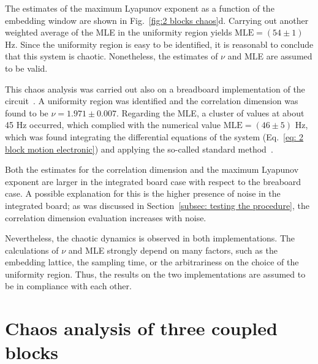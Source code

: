 The estimates of the maximum Lyapunov exponent as a function of the embedding window are shown in
Fig.~\ref{fig:2 blocks chaos}d. Carrying out another weighted average of the MLE in the uniformity region
yields $\text{MLE}=(54\pm1)$ Hz. Since the uniformity region is easy to be identified, it is reasonabl
to conclude that this system is chaotic.
Nonetheless, the estimates of $\nu$ and MLE are assumed to be valid.

This chaos analysis was carried out also on a breadboard implementation of the circuit~\cite{ref:electronic_analog}.
A uniformity region was identified and the correlation dimension was found to be
$\nu=1.971\pm0.007$. Regarding the MLE, a cluster of values at about 45 Hz occurred, which complied
with the numerical value $\text{MLE}=(46\pm5)$ Hz, which was found integrating the differential
equations of the system (Eq.~\ref{eq: 2 block motion electronic}) and applying the so-called
standard method~\cite{benettin1980lyapunov1,benettin1980lyapunov2}.

Both the estimates for the correlation dimension and the maximum Lyapunov exponent are larger
in the integrated board case with respect to the breaboard case.
A possible explanation for this is the higher presence of noise in the integrated board;
as was discussed in Section~\ref{subsec: testing the procedure}, the correlation dimension evaluation
increases with noise.

Nevertheless, the chaotic dynamics is observed in both implementations. The calculations of $\nu$ and
MLE strongly depend on many factors, such as the embedding lattice, the sampling time, or the
arbitrariness on the choice of the uniformity region.
Thus, the results on the two implementations are assumed to be in compliance with each other.


\section{Chaos analysis of three coupled blocks}\label{sec: 3 blocks chaos}




